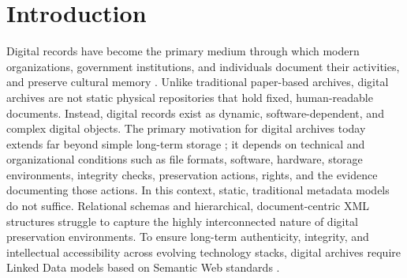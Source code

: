 \documentclass[runningheads]{llncs}
\begin{document}
	\section{Introduction}
	Digital records have become the primary medium through which modern organizations, government institutions, and individuals document their activities, and preserve cultural memory \cite{carroll2011comprehensive,liebermann2021born,jaillant2022can,hawkins2022archives,ries2022digital}. Unlike traditional paper-based archives, digital archives are not static physical repositories that hold fixed, human-readable documents. Instead, digital records exist as dynamic, software-dependent, and complex digital objects. The primary motivation for digital archives today extends far beyond simple long-term storage \cite{factor2009authenticity,gattuso2017preservation}; it depends on technical and organizational conditions such as file formats, software, hardware, storage environments, integrity checks, preservation actions, rights, and the evidence documenting those actions.
	In this context, static, traditional metadata models do not suffice. Relational schemas and hierarchical, document-centric XML structures struggle to capture the highly interconnected nature of digital preservation environments. To ensure long-term authenticity, integrity, and intellectual accessibility across evolving technology stacks, digital archives require Linked Data models based on Semantic Web standards \cite{berners2023semantic,bizer2023linked}.
	
	
\end{document}
